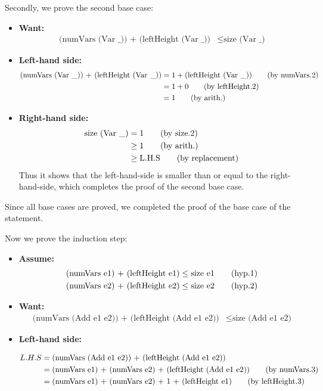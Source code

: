 \documentclass[11pt]{article}
\theoremstyle{definition}
\begin{document}
\begin{enumerate}
\begin{enumerate}
Secondly, we prove the second base case:
\begin{itemize}
\item \textbf{Want:}
\begin{align*}
\text{(numVars (Var \_)) + (leftHeight (Var \_))} &\leq \text{size (Var \_)}
\end{align*}
\item \textbf{Left-hand side:}
\begin{align*}
\text{(numVars (Var \_)) + (leftHeight (Var \_))} &= 1 + \text{(leftHeight (Var \_))}  \tag{\text{by numVars.2}} \\
                                                  &= 1 + 0 \tag{\text{by leftHeight.2}} \\
                                                  &= 1 \tag{\text{by arith.}}
\end{align*}
\item \textbf{Right-hand side:}
\begin{align*}
\text{size (Var \_)} &= 1 \tag{\text{by size.2}} \\
                     &\geq 1 \tag{\text{by arith.}} \\
					           &\geq \text{L.H.S} \tag{\text{by replacement}}
\end{align*}
Thus it shows that the left-hand-side is smaller than or equal to the right-hand-side, which completes the proof of the second base case.
\end{itemize}
Since all base cases are proved, we completed the proof of the base case of the statement.

Now we prove the induction step:
\begin{itemize}
\item \textbf{Assume:}
\begin{align*}
\text{(numVars e1) + (leftHeight e1)} &\leq \text{size e1} \tag{\text{hyp.1}} \\
\text{(numVars e2) + (leftHeight e2)} &\leq \text{size e2} \tag{\text{hyp.2}}
\end{align*}
\item \textbf{Want:}
\begin{align*}
\text{(numVars (Add e1 e2)) + (leftHeight (Add e1 e2))} &\leq \text{size (Add e1 e2)}
\end{align*}
\item \textbf{Left-hand side:}

\begin{align*}
  L.H.S &= \text{(numVars (Add e1 e2)) + (leftHeight (Add e1 e2))} \\
  &= \text{(numVars e1) + (numVars e2) + (leftHeight (Add e1 e2))} \tag{\text{by numVars.3}} \\
  &= \text{(numVars e1) + (numVars e2) + 1 + (leftHeight e1)} \tag{\text{by leftHeight.3}}
\end{align*}


\end{itemize}
\end{enumerate}
\end{enumerate}
\end{document}
